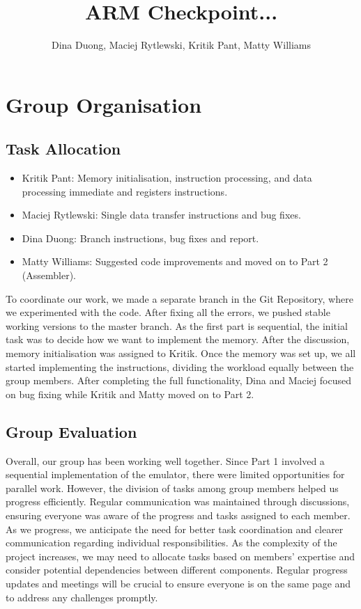 \documentclass[11pt]{article}
\begin{document}
\title{ARM Checkpoint... }
\author{Dina Duong, Maciej Rytlewski, Kritik Pant, Matty Williams}

\maketitle

\section{Group Organisation}

\subsection*{Task Allocation}

\begin{itemize}
    \item Kritik Pant: Memory initialisation, instruction processing, and data processing immediate and registers instructions.
    \item Maciej Rytlewski: Single data transfer instructions and bug fixes.
    \item Dina Duong: Branch instructions, bug fixes and report. 
    \item Matty Williams: Suggested code improvements and moved on to Part 2 (Assembler).
\end{itemize}
To coordinate our work, we made a separate branch in the Git Repository, where we experimented with the code. 
After fixing all the errors, we pushed stable working versions to the master branch. 
As the first part is sequential, the initial task was to decide how we want to implement the memory. 
After the discussion, memory initialisation was assigned to Kritik. Once the memory was set up, we all started 
implementing the instructions, dividing the workload equally between the group members. 
After completing the full functionality, Dina and Maciej focused on bug fixing while Kritik and Matty moved on to Part 2.

\subsection*{Group Evaluation}
Overall, our group has been working well together. Since Part 1 involved a sequential implementation of the emulator, 
there were limited opportunities for parallel work. However, the division of tasks among group members helped us progress efficiently.
Regular communication was maintained through discussions, ensuring everyone was aware of the progress and tasks assigned to each member.
\newline
As we progress, we anticipate the need for better task coordination and clearer communication regarding individual responsibilities. 
As the complexity of the project increases, we may need to allocate tasks based on members' expertise and consider potential 
dependencies between different components. Regular progress updates and meetings will be crucial to ensure 
everyone is on the same page and to address any challenges promptly.
\end{document}
